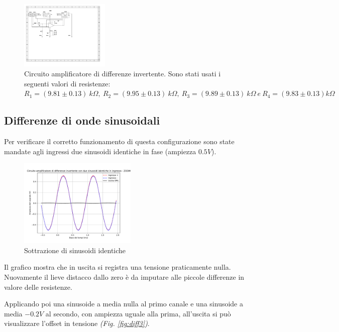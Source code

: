 \documentclass[journal]{IEEEtran}
\begin{document}
\begin{figure}[H]%
\begin {center}
\includegraphics[width=0.38\textwidth]{sch-simulations/output/OPA-difference-amp.pdf}
\caption{Circuito amplificatore di differenze invertente. Sono stati usati i seguenti valori di resistenze: $R_1 =(9.81 \pm 0.13) \ k\Omega, \ R_2 = (9.95 \pm 0.13) \ k\Omega ,\ R_3 = (9.89 \pm 0.13) \ k\Omega \ e \ R_4 = (9.83 \pm 0.13) k\Omega  $  }
\label{fig:differenze}
\end {center}
\end{figure}

\subsection{\textbf{Differenze di onde sinusoidali}}
Per verificare il corretto funzionamento di questa configurazione sono state mandate agli ingressi due sinusoidi identiche in fase (ampiezza $0.5 V$). 

\begin{figure}[H]%
\begin {center}
\includegraphics[width=0.50\textwidth]{analysis/output/OPA_diff_sin2.pdf}
\caption{Sottrazione di sinusoidi identiche}
\label{fig:diff2}
\end {center}
\end{figure}

Il grafico mostra che in uscita si registra una tensione praticamente nulla. Nuovamente il lieve distacco dallo zero è da imputare alle piccole differenze in valore delle resistenze.

Applicando poi una sinusoide a media nulla al primo canale e una sinusoide a media $-0.2 V$ al secondo, con ampiezza uguale alla prima, all'uscita si può visualizzare l'offset in tensione \textit{(Fig. \ref{fig:diff3})}. 
\end{document}
